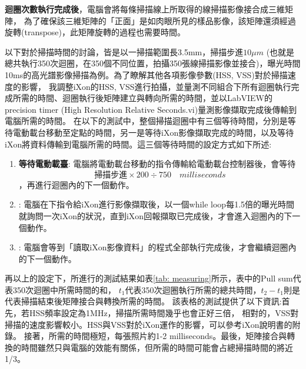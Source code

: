 \documentclass[12pt]{article}
\begin{document}
\textbf{迴圈次數執行完成後}，電腦會將每條掃描線上所取得的線掃描影像接合成三維矩陣，
為了確保該三維矩陣的「正面」是如肉眼所見的樣品影像，該矩陣還須經過旋轉(transpose)，此矩陣旋轉的過程也需要時間。

以下對於掃描時間的討論，皆是以一掃描範圍長3.5mm，掃描步進$10\mu m$ (也就是總共執行350次迴圈，在350個不同位置，拍攝350張線掃描影像並接合)，曝光時間10ms的高光譜影像掃描為例。為了瞭解其他各項影像參數(HSS, VSS)對於掃描速度的影響，
我調整iXon的HSS, VSS進行拍攝，並量測不同組合下所有迴圈執行完成所需的時間、迴圈執行後矩陣建立與轉向所需的時間，並以LabVIEW的precision timer (High Resolution Relative Seconds.vi)量測影像擷取完成後傳輸到電腦所需的時間。
在以下的測試中，整個掃描迴圈中有三個等待時間，分別是等待電動載台移動至定點的時間，另一是等待iXon影像擷取完成的時間，以及等待iXon將資料傳輸到電腦所需的時間。這三個等待時間的設定方式如下所述:
\begin{enumerate}
    \item \textbf{\CJKsans 等待電動載臺}: 電腦將電動載台移動的指令傳輸給電動載台控制器後，會等待\begin{equation} \label{eq: stageWait}
              \text{掃描步進}\times 200 \div 750 \quad milliseconds
          \end{equation}，再進行迴圈內的下一個動作。
    \item \textbf{}: 電腦在下指令給iXon進行影像擷取後，以一個while loop每1.5倍的曝光時間就詢問一次iXon的狀況，直到iXon回報擷取已完成後，才會進入迴圈內的下一個動作。
    \item \textbf{}: 電腦會等到「讀取iXon影像資料」的程式全部執行完成後，才會繼續迴圈內的下一個動作。
\end{enumerate}
再以上的設定下，所進行的測試結果如表\ref{tab: measuring}所示，表中的Pull sum代表350次迴圈中\textbf{}所需時間的和，
$t_1$代表350次迴圈執行所需的總共時間，$t_2-t_1$則是代表掃描結束後矩陣接合與轉換所需的時間。
該表格的測試提供了以下資訊:首先，若HSS頻率設定為1MHz，掃描所需時間幾乎也會正好三倍，
相對的，VSS對掃描的速度影響較小。HSS與VSS對於iXon運作的影響，可以參考iXon說明書的附錄。\cite{ixonManual}
接著，\textbf{}所需的時間極短，每張照片約1-2 milliseconds。最後，矩陣接合與轉換的時間雖然只與電腦的效能有關係，但所需的時間可能會占總掃描時間的將近1/3。
\end{document}
